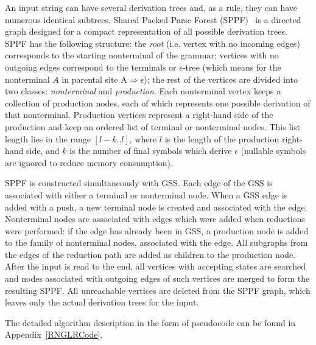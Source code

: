 An input string can have several derivation trees and, as a rule, they can have 
numerous identical subtrees. Shared Packed Parse Forest (SPPF)~\cite{SPPF} is a directed graph
designed for a compact representation of all possible derivation trees.  
SPPF has the following structure: the \emph{root} (i.e. vertex with no incoming edges) corresponds 
to the starting nonterminal of the grammar; vertices with no outgoing edges correspond to the terminals 
or $\epsilon$-tree (which means for the nonterminal $A$ in parental site $\mathrm{A} \Rightarrow \epsilon$); 
the rest of the vertices are divided into two classes: \emph{nonterminal} and \emph{production}. 
Each nonterminal vertex keeps a collection of production nodes, each of which represents one  
possible derivation of that nonterminal. Production vertices represent a right-hand side of the 
production and keep an ordered list of terminal or nonterminal nodes. This list length lies
in the range $[l-k..l]$, where $l$ is the length of the production right-hand side, and $k$ is 
the number of final symbols which derive $\epsilon$ (nullable symbols are ignored to reduce memory consumption).

SPPF is constructed simultaneously with GSS. Each edge of the GSS is associated with either 
a terminal or nonterminal node. When a GSS edge is added with a push, 
a new terminal node is created and associated with the edge. Nonterminal nodes are associated
with edges which were added when reductions were performed: if the edge has already been in GSS, 
a production node is added to the family of nonterminal nodes, associated with the edge. All subgraphs 
from the edges of the reduction path are added as children to the production node. After the input 
is read to the end, all vertices with accepting states are searched and nodes associated with 
outgoing edges of such vertices are merged to form the resulting SPPF. All unreachable vertices 
are deleted from the SPPF graph, which leaves only the actual derivation trees for the input.

The detailed algorithm description in the form of pseudocode can be found in Appendix~\ref{RNGLRCode}.